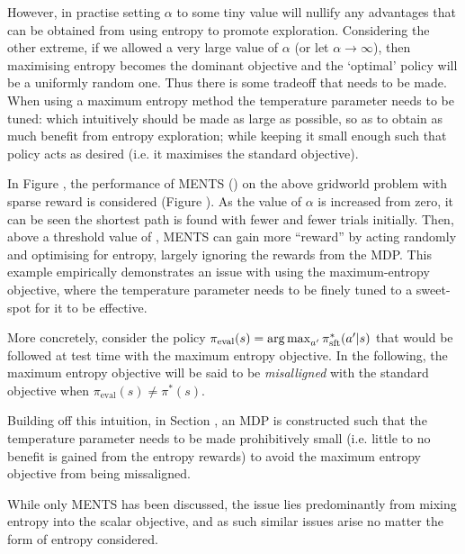     However, in practise setting $\alpha$ to some tiny value will nullify any advantages that can be obtained from using entropy to promote exploration. Considering the other extreme, if we allowed a very large value of $\alpha$ (or let $\alpha\rightarrow\infty$), then maximising entropy becomes the dominant objective and the `optimal' policy will be a uniformly random one. Thus there is some tradeoff that needs to be made. When using a maximum entropy method the temperature parameter needs to be tuned: which intuitively should be made as large as possible, so as to obtain as much benefit from entropy exploration; while keeping it small enough such that policy acts as desired (i.e. it maximises the standard objective).


    In Figure , the performance of MENTS () on the above gridworld problem with sparse reward is considered (Figure ). As the value of $\alpha$ is increased from zero, it can be seen the shortest path is found with fewer and fewer trials initially. Then, above a threshold value of , MENTS can gain more ``reward'' by acting randomly and optimising for entropy, largely ignoring the rewards from the MDP. This example empirically demonstrates an issue with using the maximum-entropy objective, where the temperature parameter needs to be finely tuned to a sweet-spot for it to be effective.

    More concretely, consider the policy $\pi_{\text{eval}}(s) = \operatorname*{arg\,max}_{a'} \pi^*_{{\textnormal{sft}}}(a'|s)$ that would be followed at test time with the maximum entropy objective. In the following, the maximum entropy objective will be said to be \textit{misalligned} with the standard objective when $\pi_{\text{eval}}(s) \neq \pi^*(s)$.

    Building off this intuition, in Section , an MDP is constructed such that the temperature parameter needs to be made prohibitively small (i.e. little to no benefit is gained from the entropy rewards) to avoid the maximum entropy objective from being missaligned.

    While only MENTS has been discussed, the issue lies predominantly from mixing entropy into the scalar objective, and as such similar issues arise no matter the form of entropy considered. 





